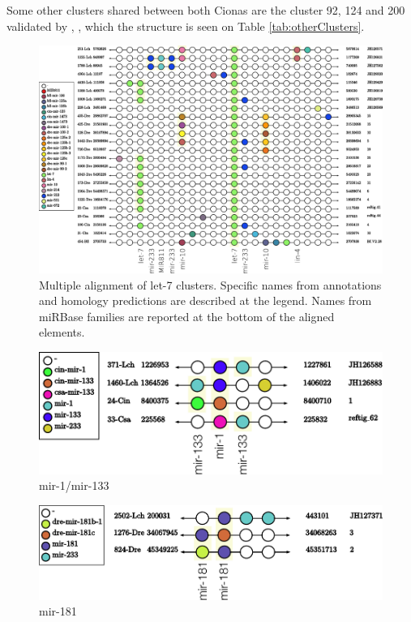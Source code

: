 \documentclass[graybox]{svmult}
\begin{document}
Some other clusters shared between both Cionas are the cluster 92, 124 and 200  
validated by \cite{Norden-Krichmar2007}, \cite{Fu2008}, \cite{Hendrix2010} 
which the structure is seen on Table \ref{tab:otherClusters}.    


\begin{figure}[ht!]
\sidecaption[t]
\includegraphics[width=\textwidth]{./Images/Cluster_images/let-7_101_128}
\caption{Multiple alignment of let-7 clusters. Specific names from annotations 
and homology predictions are described at the legend. Names from miRBase 
families are reported at the bottom of the aligned elements.} 
\label{fig:let-7}
\end{figure}

\begin{figure}[ht!]
\sidecaption[t]
\includegraphics[width=\textwidth]{./Images/Cluster_images/mir-133_113_33}
\caption{mir-1/mir-133}
\label{fig:mir-1}
\end{figure}

\begin{figure}[ht!]
\sidecaption[t]
\includegraphics[width=\textwidth]{./Images/Cluster_images/mir-181_105_2502}
\caption{mir-181}
\label{fig:mir-1}
\end{figure}
\end{document}
